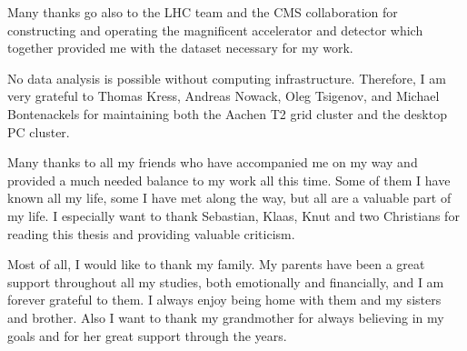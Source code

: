 Many thanks go also to the LHC team and the CMS collaboration for constructing and operating the magnificent accelerator and detector which together provided me with the dataset necessary for my work.    

No data analysis is possible without computing infrastructure. Therefore, I am very grateful to Thomas Kress, Andreas Nowack, Oleg Tsigenov, and Michael Bontenackels for maintaining both the Aachen T2 grid cluster and the desktop PC cluster.   

Many thanks to all my friends who have accompanied me on my way and provided a much needed balance to my work all this time. Some of them I have known all my life, some I have met along the way, but all are a valuable part of my life. I especially want to thank Sebastian, Klaas, Knut and two Christians for reading this thesis and providing valuable criticism. 

Most of all, I would like to thank my family. My parents have been a great support throughout all my studies, both emotionally and financially, and I am forever grateful to them. I always enjoy being home with them and my sisters and brother. Also I want to thank my grandmother for always believing in my goals and for her great support through the years.  